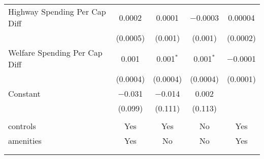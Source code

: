 \begin{table}[!htbp]
\begin{tabular}{@{\extracolsep{5pt}}lcccc}
  Highway Spending Per Cap Diff & 0.0002 & 0.0001 & $-$0.0003 & 0.00004 \\ 
  & (0.0005) & (0.001) & (0.001) & (0.0002) \\ 
  Welfare Spending Per Cap Diff & 0.001 & 0.001$^{*}$ & 0.001$^{*}$ & $-$0.0001 \\ 
  & (0.0004) & (0.0004) & (0.0004) & (0.0001) \\ 
  Constant & $-$0.031 & $-$0.014 & 0.002 &  \\ 
  & (0.099) & (0.111) & (0.113) &  \\ 
 \hline \\[-1.8ex] 
controls & Yes & Yes & No & Yes \\ 
amenities & Yes & No & No & Yes \\ 
\hline \\[-1.8ex] 
\hline 
\hline \\[-1.8ex] 
\end{tabular} 
\end{table} 
